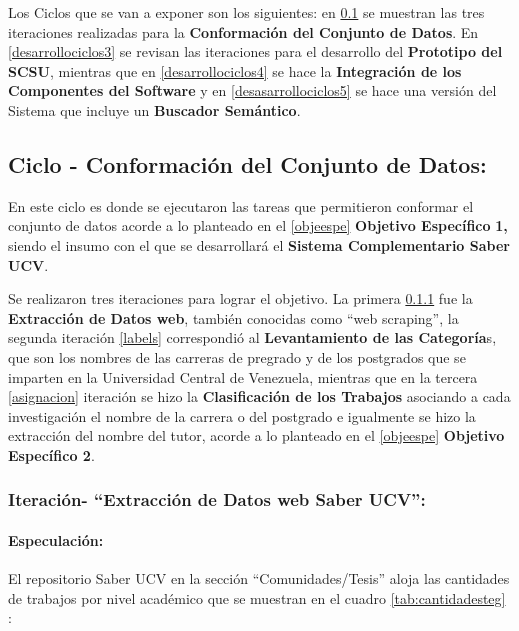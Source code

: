 \documentclass[
  12pt,
  openany]{book}
\begin{document}
Los Ciclos que se van a exponer son los siguientes: en \ref{desarrollociclos1} se muestran las tres iteraciones realizadas para la \textbf{Conformación del Conjunto de Datos}. En \ref{desarrollociclos3} se revisan las iteraciones para el desarrollo del \textbf{Prototipo del SCSU}, mientras que en \ref{desarrollociclos4} se hace la \textbf{Integración de los Componentes del Software} y en \ref{desasarrollociclos5} se hace una versión del Sistema que incluye un \textbf{Buscador Semántico}.

\newpage

\hypertarget{desarrollociclos1}{%
\subsection{Ciclo - Conformación del Conjunto de Datos:}\label{desarrollociclos1}}

En este ciclo es donde se ejecutaron las tareas que permitieron conformar el conjunto de datos acorde a lo planteado en el \ref{objeespe} \textbf{Objetivo Específico} \textbf{1,} siendo el insumo con el que se desarrollará el \textbf{Sistema Complementario Saber UCV}.

Se realizaron tres iteraciones para lograr el objetivo. La primera \ref{scrapeo} fue la \textbf{Extracción de Datos web}, también conocidas como ``web scraping'', la segunda iteración \ref{labels} correspondió al \textbf{Levantamiento de las Categoría}s, que son los nombres de las carreras de pregrado y de los postgrados que se imparten en la Universidad Central de Venezuela, mientras que en la tercera \ref{asignacion} iteración se hizo la \textbf{Clasificación de los Trabajos} asociando a cada investigación el nombre de la carrera o del postgrado e igualmente se hizo la extracción del nombre del tutor, acorde a lo planteado en el \ref{objeespe} \textbf{Objetivo Específico 2}.

\hypertarget{scrapeo}{%
\subsubsection{Iteración- ``Extracción de Datos web Saber UCV'':}\label{scrapeo}}

\hypertarget{especulaciuxf3n-1}{%
\paragraph{Especulación:}\label{especulaciuxf3n-1}}

El repositorio Saber UCV en la sección ``Comunidades/Tesis'' aloja las cantidades de trabajos por nivel académico que se muestran en el cuadro \ref{tab:cantidadesteg} :
\end{document}
